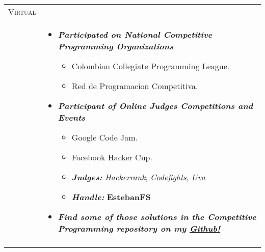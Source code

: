 \documentclass[a4paper,11pt]{article} %
\begin{document}
\begin{tabular}{r|p{12cm}}
\textsc{Virtual} & \textbf{}\\
\newline
& \footnotesize{
\begin{itemize}
\item \textbf{\textit{Participated on National Competitive Programming Organizations}}
\begin{itemize}
\item Colombian Collegiate Programming League.
\item Red de Programacion Competitiva.
\end{itemize}
\item \textbf{\textit{Participant of Online Judges Competitions and Events}}
\begin{itemize}
\item Google Code Jam.
\item Facebook Hacker Cup.
\item \textbf{\emph{Judges:}} \href{https://www.hackerrank.com/EstebanFS}{\emph{Hackerrank}}, \href{https://app.codesignal.com/profile/EstebanFS}{\emph{Codefights}}, \href{http://uhunt.felix-halim.net/id/152728}{\emph{Uva}}
\item \textbf{\emph{Handle:}} \textbf{EstebanFS}
\end{itemize}
\item \textbf{\textit{Find some of those solutions in the Competitive Programming repository on my \href{https://github.com/EstebanFS/Competitive-Programming}{\emph{Github!}}}}
\end{itemize}}\\
\multicolumn{2}{c}{} \\
\end{tabular}

\newpage
\end{document}
